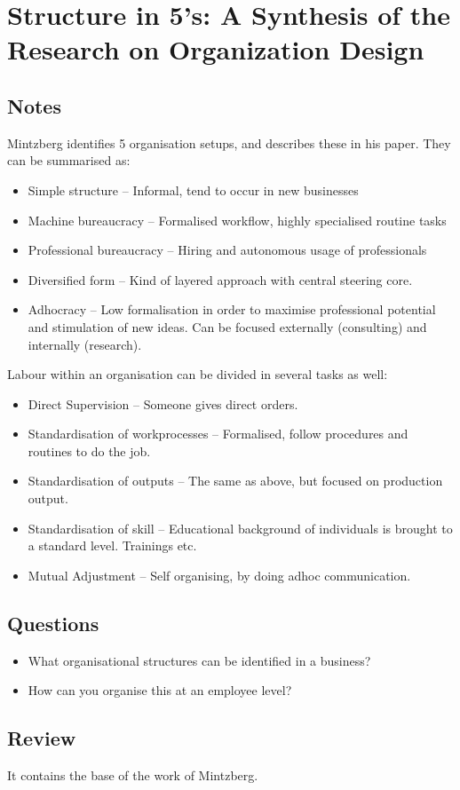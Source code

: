 \chapter{Structure in 5's: A Synthesis of the Research on Organization Design \cite{structure-5}}
\section{Notes}
Mintzberg identifies 5 organisation setups, and describes these in his paper. 
They can be summarised as:
\begin{itemize}
\item Simple structure -- Informal, tend to occur in new businesses
\item Machine bureaucracy -- Formalised workflow, highly specialised routine tasks
\item Professional bureaucracy -- Hiring and autonomous usage of professionals
\item Diversified form -- Kind of layered approach with central steering core.
\item Adhocracy -- Low formalisation in order to maximise professional potential and stimulation of new ideas. Can be focused externally (consulting) and internally (research). 
\end{itemize}

Labour within an organisation can be divided in several tasks as well:
\begin{itemize}
  \item Direct Supervision -- Someone gives direct orders.
  \item Standardisation of workprocesses -- Formalised, follow procedures and routines to do the job.
  \item Standardisation of outputs -- The same as above, but focused on production output.
  \item Standardisation of skill -- Educational background of individuals is brought to a standard level. Trainings etc. 
  \item Mutual Adjustment -- Self organising, by doing adhoc communication.
\end{itemize}

\section{Questions}
\begin{itemize}
  \item What organisational structures can be identified in a business?
  \item How can you organise this at an employee level?
\end{itemize}

\section{Review}
It contains the base of the work of Mintzberg.
